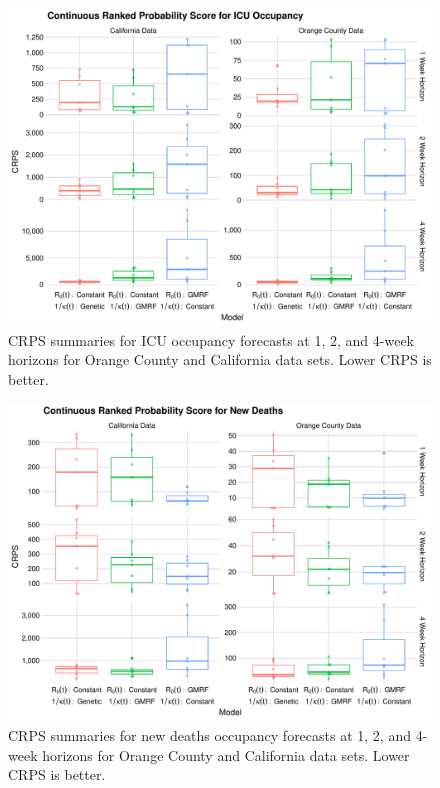 \begin{figure}
    \centering
    \includegraphics[width=1.0\columnwidth]{real_data_crps_comparison_boxplot_data_icu_plot}
    \caption[CRPS summaries for ICU occupancy forecasts for real data sets.]{CRPS summaries for ICU occupancy forecasts at 1, 2, and 4-week horizons for Orange County and California data sets. Lower CRPS is better.}
    \label{ch_5:fig:real_data_crps_comparison_boxplot_data_icu_plot}
\end{figure}

\begin{figure}
    \centering
    \includegraphics[width=1.0\columnwidth]{real_data_crps_comparison_boxplot_data_new_deaths_plot}
    \caption[CRPS summaries for new deaths occupancy forecasts for real data sets.]{CRPS summaries for new deaths occupancy forecasts at 1, 2, and 4-week horizons for Orange County and California data sets. Lower CRPS is better.}
    \label{ch_5:fig:real_data_crps_comparison_boxplot_data_new_deaths_plot}
\end{figure}

